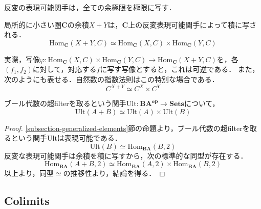 \documentclass[uplatex, dvipdfmx]{jsarticle}
\begin{document}
\begin{corollary}
    反変の表現可能関手は，全ての余極限を極限に写す．
\end{corollary}
\begin{example*}
    局所的に小さい圏$\mathbf{C}$の余積$X+Y$は，$\mathbf{C}$上の反変表現可能関手によって積に写される．
    \[ \mathrm{Hom}_\mathbf{C}(X+Y,C)\simeq \mathrm{Hom}_\mathbf{C}(X,C)\times \mathrm{Hom}_\mathbf{C}(Y,C) \]
    \begin{center}
    \end{center}
    実際，写像$\varphi:\mathrm{Hom}_\mathbf{C}(X,C)\times \mathrm{Hom}_\mathbf{C}(Y,C)\to\mathrm{Hom}_\mathbf{C}(X+Y,C)$を，各$(f_1,f_2)$に対して，対応する$f$に写す写像とすると，これは可逆である．
    また，次のようにも表せる．自然数の指数法則はこの特別な場合である．
    \[ C^{X+Y}\simeq C^X\times C^Y \]
\end{example*}
\begin{proposition*}
    ブール代数の超filterを取るという関手$\mathrm{Ult}:\mathbf{BA^{op}}\to\mathbf{Sets}$について，
    \[ \mathrm{Ult}(A+B)\simeq\mathrm{Ult}(A)\times\mathrm{Ult}(B) \]
\end{proposition*}
\begin{proof}
    \ref{subsection-generalized-elements}節の命題より，ブール代数の超filterを取るという関手$\mathrm{Ult}$は表現可能である．
    \[ \mathrm{Ult}(B)\simeq\mathrm{Hom}_\mathbf{BA}(B,2) \]
    反変な表現可能関手は余積を積に写すから，次の標準的な同型が存在する．
    \[ \mathrm{Hom}_\mathbf{BA}(A+B,2) \simeq \mathrm{Hom}_\mathbf{BA}(A,2)\times\mathrm{Hom}_\mathbf{BA}(B,2) \]
    以上より，同型$\simeq$の推移性より，結論を得る．
\end{proof}

\subsection{Colimits}
\end{document}
